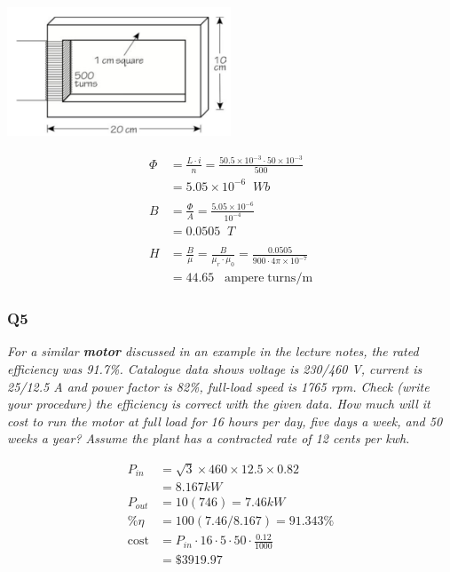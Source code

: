 \documentclass[a4paper,11pt]{article}
\begin{document}
\includegraphics[width=0.5\textwidth]{core.png}

\begin{align*}
    \Phi & = \frac{L\cdot i}{n} = \frac{50.5\times10^{-3} \cdot 50 \times 10^{-3}}{500} \\
         &= 5.05\times10^{-6}\;\;Wb\\\\
    B    & = \frac{\Phi}{A} = \frac{5.05\times10^{-6}}{10^{-4}}\\
         & = 0.0505 \;\;T \\\\
    H    & = \frac{B}{\mu} = \frac{B}{\mu_r \cdot \mu_0} = \frac{0.0505}{900 \cdot 4\pi\times 10^{-7}} \\
         & = 44.65 \;\;\;\mathrm{ampere \; turns/m}
\end{align*}



\subsubsection*{Q5}
\textit{For a similar \textbf{motor} discussed in an example in the lecture notes, the rated efficiency was 91.7\%. Catalogue data shows voltage is 230/460 V, current is 25/12.5 A and power factor is 82\%, full-load speed is 1765 rpm. Check (write your procedure) the efficiency is correct with the given data. How much will it cost to run the motor at full load for 16 hours per day, five days a week, and 50 weeks a year? Assume the plant has a contracted rate of 12 cents per kwh.}

\begin{align*}
    P_{in} & =\sqrt{3}\times460\times12.5\times0.82 \\
           & = 8.167kW \\
    P_{out} &= 10(746) = 7.46kW \\
    \%\eta &= 100(7.46/8.167)=91.343\%\\
    \mathrm{cost} &= P_{in} \cdot 16 \cdot 5 \cdot 50 \cdot \frac{0.12}{1000}\\
    &=\$3919.97
\end{align*}
\end{document}
